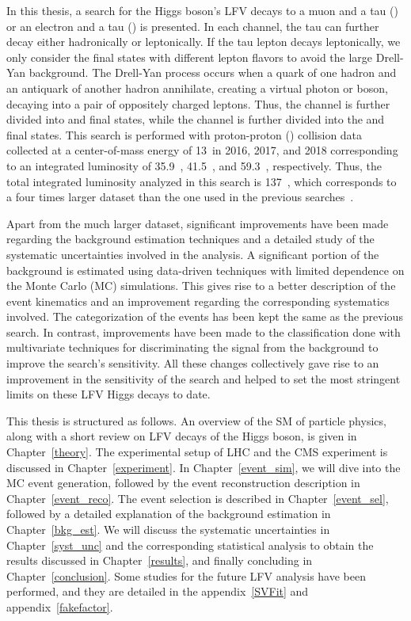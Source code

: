 In this thesis, a search for the Higgs boson's LFV decays to a muon and a tau (\mutau) or an electron and a tau (\etau) is presented. In each channel, the tau can further decay either hadronically or leptonically. If the tau lepton decays leptonically, we only consider the final states with different lepton flavors to avoid the large Drell-Yan background. The Drell-Yan process occurs when a quark of one hadron and an antiquark of another hadron annihilate, creating a virtual photon or \PZ boson, decaying into a pair of oppositely charged leptons. Thus, the \mutau channel is further divided into \muhad and \mue final states, while the \etau channel is further divided into the \ehad and \emu final states. This search is performed with proton-proton (\pp) collision data collected at a center-of-mass energy of 13~\TeV in 2016, 2017, and 2018 corresponding to an integrated luminosity of 35.9~\fb, 41.5~\fb, and 59.3~\fb, respectively. Thus, the total integrated luminosity analyzed in this search is 137~\fb, which corresponds to a four times larger dataset than the one used in the previous searches~\cite{Sirunyan:2017xzt, Aad:2019ugc}.

Apart from the much larger dataset, significant improvements have been made regarding the background estimation techniques and a detailed study of the systematic uncertainties involved in the analysis. A significant portion of the background is estimated using data-driven techniques with limited dependence on the Monte Carlo (MC) simulations. This gives rise to a better description of the event kinematics and an improvement regarding the corresponding systematics involved. The categorization of the events has been kept the same as the previous search. In contrast, improvements have been made to the classification done with multivariate techniques for discriminating the signal from the background to improve the search's sensitivity. All these changes collectively gave rise to an improvement in the sensitivity of the search and helped to set the most stringent limits on these LFV Higgs decays to date.

This thesis is structured as follows. An overview of the SM of particle physics, along with a short review on LFV decays of the Higgs boson, is given in Chapter~\ref{theory}. The experimental setup of LHC and the CMS experiment is discussed in Chapter~\ref{experiment}. In Chapter~\ref{event_sim}, we will dive into the MC event generation, followed by the event reconstruction description in Chapter~\ref{event_reco}. The event selection is described in Chapter~\ref{event_sel}, followed by a detailed explanation of the background estimation in Chapter~\ref{bkg_est}. We will discuss the systematic uncertainties in Chapter~\ref{syst_unc} and the corresponding statistical analysis to obtain the results discussed in Chapter~\ref{results}, and finally concluding in Chapter~\ref{conclusion}. Some studies for the future LFV analysis have been performed, and they are detailed in the appendix~\ref{SVFit} and appendix~\ref{fakefactor}.

